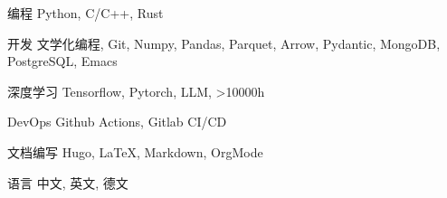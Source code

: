 \documentclass[../cv_xin_cn.tex]{subfiles}
\begin{document}


\begin{cvskills}

  \cvskill
    {编程} %
    {Python, C/C++, Rust} %

  \cvskill
    {开发} %
    {文学化编程, Git, Numpy, Pandas, Parquet, Arrow, Pydantic, MongoDB, PostgreSQL, Emacs} %

  \cvskill
    {深度学习} %
    {Tensorflow, Pytorch, LLM, >10000h} %

  \cvskill
    {DevOps} %
    {Github Actions, Gitlab CI/CD} %

  \cvskill
    {文档编写} %
    {Hugo, LaTeX, Markdown, OrgMode} %

  \cvskill
    {语言} %
    {中文, 英文, 德文} %

\end{cvskills}
\end{document}
